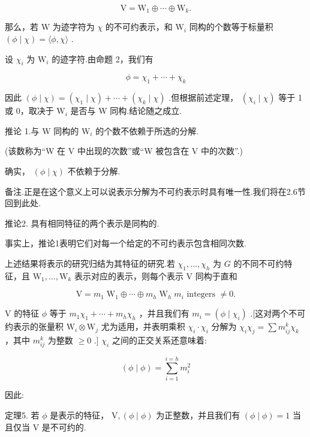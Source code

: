 \[
\mathrm{V} = {\mathrm{W}}_{1} \oplus  \cdots  \oplus  {\mathrm{W}}_{k}.
\]

那么，若 \(\mathrm{W}\) 为迹字符为 \(\chi\) 的不可约表示，和 \({\mathrm{W}}_{i}\) 同构的个数等于标量积 \(\left( {\phi  \mid  \chi }\right)  = \langle \phi ,\chi \rangle\) .

设 \({\chi }_{i}\) 为 \({\mathrm{W}}_{i}\) 的迹字符.由命题 2，我们有

\[
\phi  = {\chi }_{1} + \cdots  + {\chi }_{k}
\]

因此 \(\left( {\phi  \mid  \chi }\right)  = \left( {{\chi }_{1} \mid  \chi }\right)  + \cdots  + \left( {{\chi }_{k} \mid  \chi }\right)\) .但根据前述定理， \(\left( {{\chi }_{i} \mid  \chi }\right)\) 等于 1 或 0，取决于 \({\mathrm{W}}_{i}\) 是否与 W 同构.结论随之成立.

推论 1.与 \(\mathrm{W}\) 同构的 \({\mathrm{W}}_{i}\) 的个数不依赖于所选的分解.

(该数称为“W 在 V 中出现的次数”或“W 被包含在 V 中的次数”.)

确实， \(\left( {\phi  \mid  \chi }\right)\) 不依赖于分解.

备注.正是在这个意义上可以说表示分解为不可约表示时具有唯一性.我们将在2.6节回到此处.

推论2. 具有相同特征的两个表示是同构的.

事实上，推论1表明它们对每一个给定的不可约表示包含相同次数.

上述结果将表示的研究归结为其特征的研究.若 \({\chi }_{1},\ldots ,{\chi }_{h}\) 为 \(G\) 的不同不可约特征，且 \({\mathrm{W}}_{1},\ldots ,{\mathrm{W}}_{k}\) 表示对应的表示，则每个表示 \(\mathrm{V}\) 同构于直和

\[
\mathrm{V} = {m}_{1}{\mathrm{\;W}}_{1} \oplus  \cdots  \oplus  {m}_{h}{\mathrm{\;W}}_{h}\;{m}_{i}\text{ integers } \neq  0.
\]

\(\mathrm{V}\) 的特征 \(\phi\) 等于 \({m}_{1}{\chi }_{1} + \cdots  + {m}_{h}{\chi }_{h}\) ，并且我们有 \({m}_{i} = \left( {\phi  \mid  {\chi }_{i}}\right)\) .[这对两个不可约表示的张量积 \({\mathrm{W}}_{i} \otimes  {\mathrm{W}}_{j}\) 尤为适用，并表明乘积 \({\chi }_{i} \cdot  {\chi }_{i}\) 分解为 \({\chi }_{i}{\chi }_{j} = \sum {m}_{ij}^{k}{\chi }_{k}\) ，其中 \({m}_{ij}^{k}\) 为整数 \(\geq  0\) .] \({\chi }_{i}\) 之间的正交关系还意味着:

\[
\left( {\phi  \mid  \phi }\right)  = \mathop{\sum }\limits_{{i = 1}}^{{i = h}}{m}_{i}^{2}
\]

因此:

定理5. 若 \(\phi\) 是表示的特征， \(\mathrm{V},\left( {\phi  \mid  \phi }\right)\) 为正整数，并且我们有 \(\left( {\phi  \mid  \phi }\right)  = 1\) 当且仅当 \(\mathrm{V}\) 是不可约的.

